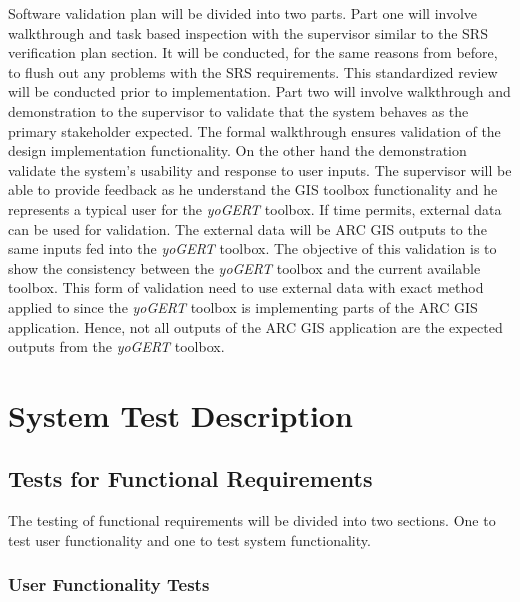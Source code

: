 \documentclass[12pt, titlepage]{article}
\begin{document}
Software validation plan will be divided into two parts. Part one will involve walkthrough and task based inspection with the supervisor similar to the SRS 
verification plan section. It will be conducted, for the same reasons from before, to flush out any problems with the SRS requirements. This standardized review will be conducted prior to implementation. Part two will involve walkthrough and demonstration to the supervisor to validate that the system behaves as the primary stakeholder expected. The formal walkthrough ensures validation of the design implementation functionality. On the other hand the demonstration validate the system's usability and response to user inputs. The supervisor will be able to provide feedback as he understand the GIS toolbox functionality and he represents a typical user for the \emph{yoGERT} toolbox. 
If time permits, external data can be used for validation. The external data will be ARC GIS outputs to the same inputs fed into the \emph{yoGERT} toolbox. The objective of this validation is to show the consistency between the \emph{yoGERT} toolbox and the current available toolbox. This form of validation need to use external data with exact method applied to since the \emph{yoGERT} toolbox is implementing parts of the ARC GIS application. Hence, not all outputs of the ARC GIS application are the expected outputs from the \emph{yoGERT} toolbox.




\section{System Test Description}
	
\subsection{Tests for Functional Requirements}

The testing of functional requirements will be divided into two sections. One to test user functionality and one to test system functionality. 

\subsubsection{User Functionality Tests}
\end{document}
